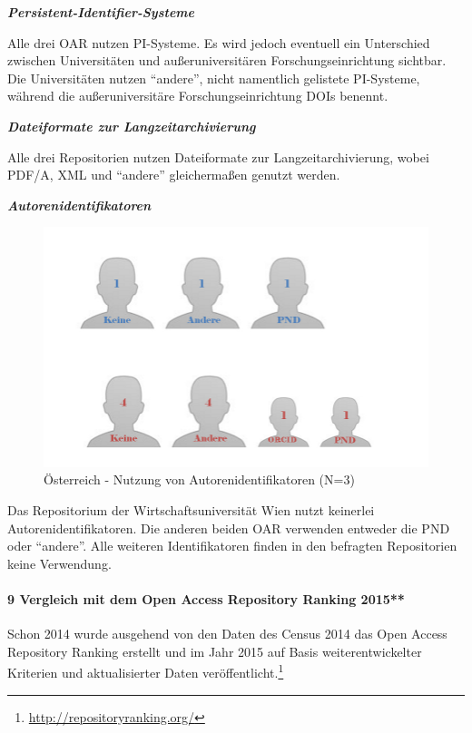 \documentclass[a4paper,
fontsize=11pt,
oneside,
numbers=noperiodatend,
parskip=half-,
bibliography=totoc,
final
]{scrartcl}
\begin{document}
\textbf{\emph{Persistent-Identifier-Systeme}}

Alle drei OAR nutzen PI-Systeme. Es wird jedoch eventuell ein
Unterschied zwischen Universitäten und außeruniversitären
Forschungseinrichtung sichtbar. Die Universitäten nutzen
\enquote{andere}, nicht namentlich gelistete PI-Systeme, während die
außeruniversitäre Forschungseinrichtung DOIs benennt.

\textbf{\emph{Dateiformate zur Langzeitarchivierung }}

Alle drei Repositorien nutzen Dateiformate zur Langzeitarchivierung,
wobei PDF/A, XML und \enquote{andere} gleichermaßen genutzt werden.

\textbf{\emph{Autorenidentifikatoren}}

\begin{figure}[htbp]
\centering
\includegraphics{img/abb10_autorenidentifikatior.jpg}
\caption{Österreich - Nutzung von Autorenidentifikatoren
(N=3)}
\end{figure}

Das Repositorium der Wirtschaftsuniversität Wien nutzt keinerlei
Autorenidentifikatoren. Die anderen beiden OAR verwenden entweder die
PND oder \enquote{andere}. Alle weiteren Identifikatoren finden in den
befragten Repositorien keine Verwendung.

\paragraph{9 Vergleich mit dem Open Access Repository Ranking
2015**}\label{vergleich-mit-dem-open-access-repository-ranking-2015}

Schon 2014 wurde ausgehend von den Daten des Census 2014 das Open Access
Repository Ranking erstellt und im Jahr 2015 auf Basis
weiterentwickelter Kriterien und aktualisierter Daten
veröffentlicht.\footnote{\url{http://repositoryranking.org/}}
\end{document}
